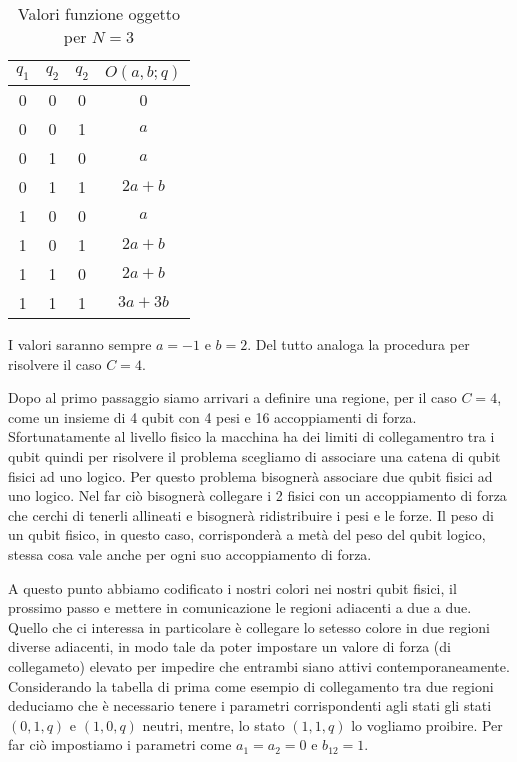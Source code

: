 \begin{table}
  \begin{center}
    \begin{tabular}{ c | c | c | c }
      $q_1$ & $q_2$ & $q_2$ & $O(a, b; q)$       \\ \hline
      0     & 0     & 0     & 0                  \\
      0     & 0     & 1     & $a$                \\
      0     & 1     & 0     & $a$                \\
      0     & 1     & 1     & $2a + b$           \\
      1     & 0     & 0     & $a$                \\
      1     & 0     & 1     & $2a + b$           \\
      1     & 1     & 0     & $2a + b$           \\
      1     & 1     & 1     & $3a + 3b$          \\
    \end{tabular}
    \caption{Valori funzione oggetto per $N = 3$}
  \end{center}
\end{table}
I valori saranno sempre $a = -1$ e $b = 2$.
Del tutto analoga la procedura per risolvere il caso $C = 4$.

Dopo al primo passaggio siamo arrivari a definire una regione, per il caso $C = 4$, come un insieme di 4 qubit con 4 pesi e 16 accoppiamenti di forza. Sfortunatamente al livello fisico la macchina ha dei limiti di collegamentro tra i qubit quindi per risolvere il problema scegliamo di associare una catena di qubit fisici ad uno logico. Per questo problema bisognerà associare due qubit fisici ad uno logico. Nel far ciò bisognerà collegare i 2 fisici con un accoppiamento di forza che cerchi di tenerli allineati e bisognerà ridistribuire i pesi e le forze. Il peso di un qubit fisico, in questo caso, corrisponderà a metà del peso del qubit logico, stessa cosa vale anche per ogni suo accoppiamento di forza.

A questo punto abbiamo codificato i nostri colori nei nostri qubit fisici, il prossimo passo e mettere in comunicazione le regioni adiacenti a due a due. Quello che ci interessa in particolare è collegare lo setesso colore in due regioni diverse adiacenti, in modo tale da poter impostare un valore di forza (di collegameto) elevato per impedire che entrambi siano attivi contemporaneamente. Considerando la tabella di prima come esempio di collegamento tra due regioni deduciamo che è necessario tenere i parametri corrispondenti agli stati  gli stati $(0,1,q)$ e $(1,0,q)$ neutri, mentre, lo stato $(1,1,q)$ lo vogliamo proibire. Per far ciò impostiamo i parametri come $a_1 = a_2 = 0$ e $b_12 = 1$.

